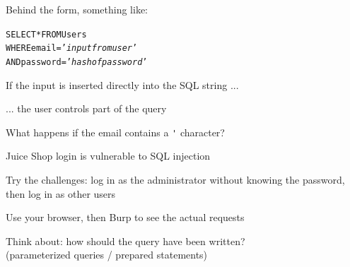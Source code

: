 \documentclass[Screen16to9,17pt]{foils}
\begin{document}

\begin{list2}
\item Behind the form, something like:
\end{list2}

\begin{alltt}\footnotesize
SELECT * FROM Users
 WHERE email = '\emph{input from user}'
   AND password = '\emph{hash of password}'
\end{alltt}

\begin{list2}
\item If the input is inserted directly into the SQL string ...
\item ... the user controls part of the query
\item What happens if the email contains a \verb+'+ character?
\end{list2}


\begin{list2}
\item Juice Shop login is vulnerable to SQL injection
\item Try the challenges: log in as the administrator without knowing the password,\\
  then log in as other users
\item Use your browser, then Burp to see the actual requests
\item Think about: how should the query have been written?\\
  (parameterized queries / prepared statements)
\end{list2}







\slidenext{}
\end{document}
